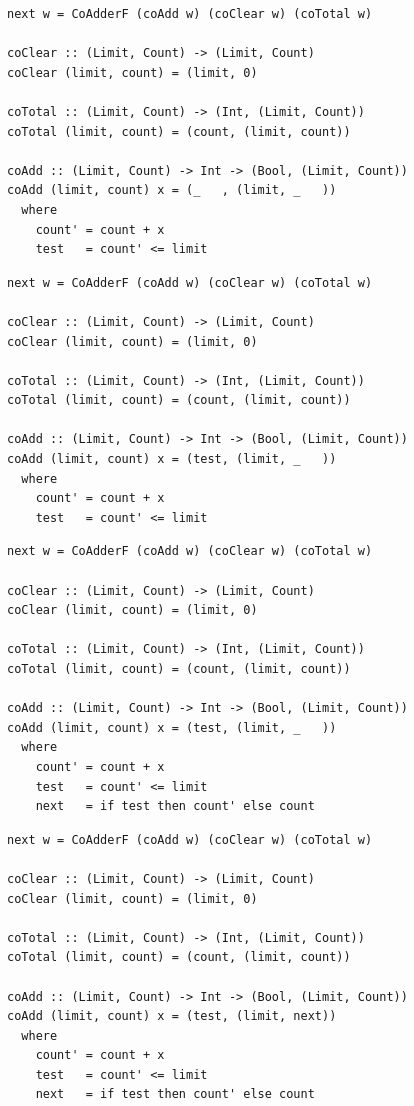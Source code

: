 \documentclass{beamer}
\begin{document}
\begin{frame}[fragile]
\begin{overprint}
\begin{verbatim}
    \end{verbatim}
    \begin{verbatim}
next w = CoAdderF (coAdd w) (coClear w) (coTotal w)

coClear :: (Limit, Count) -> (Limit, Count)
coClear (limit, count) = (limit, 0)

coTotal :: (Limit, Count) -> (Int, (Limit, Count))
coTotal (limit, count) = (count, (limit, count))

coAdd :: (Limit, Count) -> Int -> (Bool, (Limit, Count))
coAdd (limit, count) x = (_   , (limit, _   ))
  where
    count' = count + x
    test   = count' <= limit

  \end{verbatim}
    \begin{verbatim}
next w = CoAdderF (coAdd w) (coClear w) (coTotal w)

coClear :: (Limit, Count) -> (Limit, Count)
coClear (limit, count) = (limit, 0)

coTotal :: (Limit, Count) -> (Int, (Limit, Count))
coTotal (limit, count) = (count, (limit, count))

coAdd :: (Limit, Count) -> Int -> (Bool, (Limit, Count))
coAdd (limit, count) x = (test, (limit, _   ))
  where
    count' = count + x
    test   = count' <= limit

  \end{verbatim}
    \begin{verbatim}
next w = CoAdderF (coAdd w) (coClear w) (coTotal w)

coClear :: (Limit, Count) -> (Limit, Count)
coClear (limit, count) = (limit, 0)

coTotal :: (Limit, Count) -> (Int, (Limit, Count))
coTotal (limit, count) = (count, (limit, count))

coAdd :: (Limit, Count) -> Int -> (Bool, (Limit, Count))
coAdd (limit, count) x = (test, (limit, _   ))
  where
    count' = count + x
    test   = count' <= limit
    next   = if test then count' else count
  \end{verbatim}
    \begin{verbatim}
next w = CoAdderF (coAdd w) (coClear w) (coTotal w)

coClear :: (Limit, Count) -> (Limit, Count)
coClear (limit, count) = (limit, 0)

coTotal :: (Limit, Count) -> (Int, (Limit, Count))
coTotal (limit, count) = (count, (limit, count))

coAdd :: (Limit, Count) -> Int -> (Bool, (Limit, Count))
coAdd (limit, count) x = (test, (limit, next))
  where
    count' = count + x
    test   = count' <= limit
    next   = if test then count' else count
  \end{verbatim}
  \end{overprint}
\end{frame}
\end{document}
